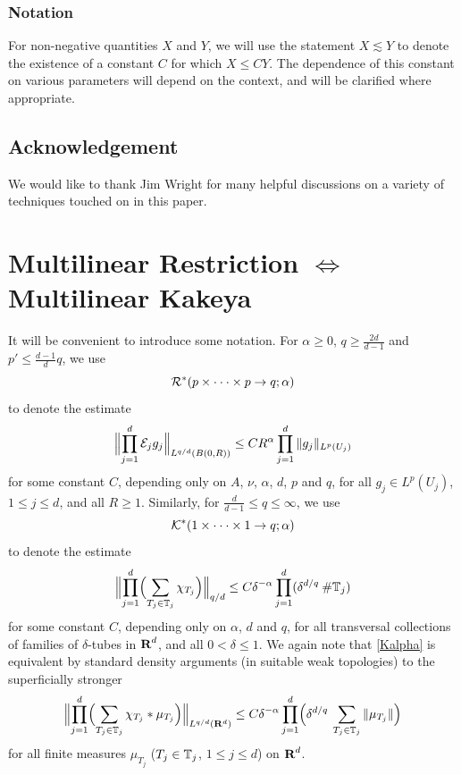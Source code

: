 \subsubsection*{Notation}
For non-negative quantities $X$ and $Y$, we will use the statement
$X\lesssim Y$ to denote the existence of a constant $C$ for which
$X\leq CY$. The dependence of this constant on various parameters
will depend on the context, and will be clarified where
appropriate.

\subsection*{Acknowledgement}
We would like to thank Jim Wright for many helpful discussions on
a variety of techniques touched on in this paper.

\section{Multilinear Restriction $\iff$ Multilinear Kakeya}\label{RK}

It will be convenient to introduce some notation.
For $\alpha\geq 0$, $q\geq\tfrac{2d}{d-1}$ and
$p'\leq \tfrac{d-1}{d}q$, we use
$${\mathcal{R}}^*(p\times\cdot\cdot\cdot\times p\rightarrow q;\alpha)$$
to denote the estimate
$$
\Bigl\|\prod_{j=1}^{d}{\mathcal{E}}_{j}g_{j}\Bigr\|_{L^{q/d}(B(0,R))}\leq C
R^{\alpha}\prod_{j=1}^{d} \|g_{j}\|_{L^p(U_j)}
$$
for some constant $C$, depending only on $A$, $\nu$, $\alpha$,
$d$, $p$ and $q$, for all $g_{j}\in L^p(U_j)$, $1\leq j\leq d$,
and all $R\geq 1$. Similarly, for $\tfrac{d}{d-1}\leq
q\leq\infty$, we use
$${\mathcal{K}}^{*}(1\times\cdot\cdot\cdot\times 1\rightarrow q;\alpha)$$
to denote the estimate
\begin{equation}\label{Kalpha}
\Bigl\|\prod_{j=1}^{d}\Bigl(\sum_{T_{j}\in{\mathbb{T}}_{j}}
\chi_{T_{j}}\Bigr)\Bigr\|_{q/d}\leq C \delta^{-\alpha}
\prod_{j=1}^{d}(\delta^{d/q}\: \mbox{\#}{\mathbb{T}}_{j})
\end{equation}
for some constant $C$, depending only on $\alpha$, $d$ and $q$,
for all transversal collections of families of
$\delta$-tubes in
${\hbox{\bf R}}^{d}$, and all $0<\delta\leq 1$. We again note that
\eqref{Kalpha} is equivalent by standard density arguments (in suitable weak topologies)
to the superficially stronger
\begin{equation}\label{Kalphasuper}
\Bigl\|\prod_{j=1}^{d}\Bigl(\sum_{T_{j}\in{\mathbb{T}}_{j}}\chi_{T_{j}}*\mu_{T_{j}}\Bigr)\Bigr\|_{L^{q/d}({\bf
R}^d)} \leq C \delta^{-\alpha}\prod_{j=1}^{d}\Bigl(\delta^{d/q}\:
\sum_{T_{j}\in{\mathbb{T}}_{j}}\|\mu_{T_{j}}\|\Bigr)
\end{equation}
for all finite measures $\mu_{T_{j}}$ ($T_j\in{\mathbb{T}}_j$,
$1\leq j\leq d$) on ${\hbox{\bf R}}^d$.

